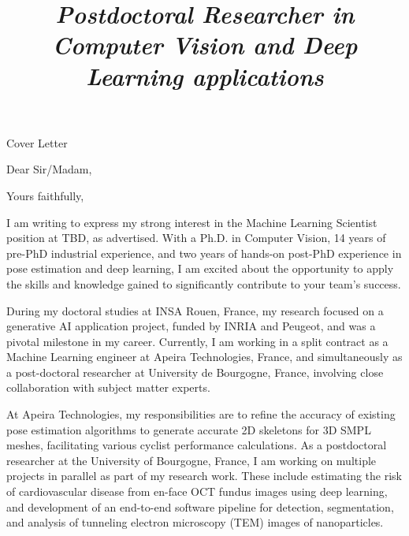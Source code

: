 \documentclass[11pt, a4paper, sans, final]{moderncv}
\title{\emph{Postdoctoral Researcher in Computer Vision and \newline Deep Learning applications}}
\begin{document}
\newcommand{\jobTitle}{Machine Learning Scientist }
\newcommand{\companyName}{TBD}

{\Huge Cover Letter \par}    %
\recipient{\companyName}{ TBD}  %
\opening{Dear Sir/Madam,}
\closing{ \bigskip Yours faithfully,}
\makelettertitle                       %
I am writing to express my strong interest in the \jobTitle position at \companyName,  %
as advertised.
With a Ph.D. in Computer Vision, 14 years of pre-PhD industrial experience, and two years of hands-on post-PhD experience in pose estimation and deep learning, I am excited about the opportunity to apply the skills and knowledge gained to significantly contribute to your team's success.

During my doctoral studies at INSA Rouen, France, my research focused on a generative AI application project, funded by INRIA and Peugeot, and was a pivotal milestone in my career. 
Currently, I am working in a split contract as a Machine Learning engineer at Apeira Technologies, France, and simultaneously as a post-doctoral researcher at University de Bourgogne, France, involving close collaboration with subject matter experts.

At Apeira Technologies, my responsibilities are to refine the accuracy of existing pose estimation algorithms to generate accurate 2D skeletons for 3D SMPL meshes, facilitating various cyclist performance calculations.
As a postdoctoral researcher at the University of Bourgogne, France, I am working on multiple projects in parallel as part of my research work. These include estimating the risk of cardiovascular disease from en-face OCT fundus images using deep learning, and development of an end-to-end software pipeline for detection, segmentation, and analysis of tunneling electron microscopy (TEM) images of nanoparticles.  
\end{document}
